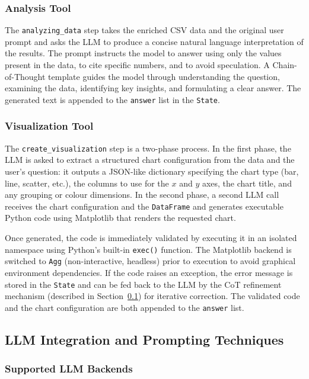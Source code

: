 \documentclass[11pt,a4paper]{article}
\begin{document}
\subsubsection{Analysis Tool}

The \texttt{analyzing\_data} step takes the enriched CSV data and the original user
prompt and asks the LLM to produce a concise natural language interpretation of the
results. The prompt instructs the model to answer using only the values present in
the data, to cite specific numbers, and to avoid speculation. A Chain-of-Thought
template guides the model through understanding the question, examining the data,
identifying key insights, and formulating a clear answer. The generated text is
appended to the \texttt{answer} list in the \texttt{State}.

\subsubsection{Visualization Tool}

The \texttt{create\_visualization} step is a two-phase process. In the first phase,
the LLM is asked to extract a structured chart configuration from the data and the
user's question: it outputs a JSON-like dictionary specifying the chart type (bar,
line, scatter, etc.), the columns to use for the $x$ and $y$ axes, the chart title,
and any grouping or colour dimensions. In the second phase, a second LLM call
receives the chart configuration and the \texttt{DataFrame} and generates executable
Python code using Matplotlib that renders the requested chart.

Once generated, the code is immediately validated by executing it in an isolated
namespace using Python's built-in \texttt{exec()} function. The Matplotlib backend
is switched to \texttt{Agg} (non-interactive, headless) prior to execution to avoid
graphical environment dependencies. If the code raises an exception, the error
message is stored in the \texttt{State} and can be fed back to the LLM by the CoT
refinement mechanism (described in Section~\ref{subsec:prompting}) for iterative
correction. The validated code and the chart configuration are both appended to the
\texttt{answer} list.

\subsection{LLM Integration and Prompting Techniques}
\label{subsec:prompting}

\subsubsection{Supported LLM Backends}
\end{document}
